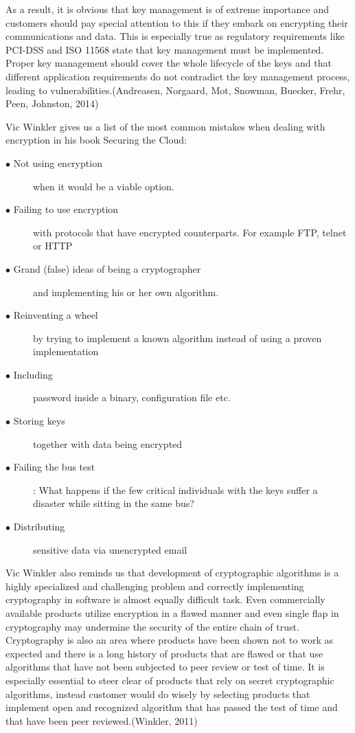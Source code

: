\documentclass{article}
\begin{document}
\par
As a result, it is obvious that key management is of extreme importance and customers should pay special attention to this if they embark on encrypting their communications and data. This is especially true as regulatory requirements like PCI-DSS and ISO 11568 state that key management must be implemented. Proper key management should cover the whole lifecycle of the keys and that different application requirements do not contradict the key management process, leading to vulnerabilities.(Andreasen, Norgaard, Mot, Snowman, Buecker, Frehr, Peen, Johnston, 2014)
\par
Vic Winkler gives us a list of the most common mistakes when dealing with encryption in his book Securing the Cloud:
\begin{description}
	\item[$\bullet$ Not using encryption] when it would be a viable option.
	\item[$\bullet$ Failing to use encryption] with protocols that have encrypted counterparts. For example FTP, telnet or HTTP 
	\item[$\bullet$ Grand (false) ideas of being a cryptographer] and implementing his or her own algorithm. 
	\item[$\bullet$ Reinventing a wheel] by trying to implement a known algorithm instead of using a proven implementation
	\item[$\bullet$ Including] password inside a binary, configuration file etc.
	\item[$\bullet$ Storing keys] together with data being encrypted
	\item[$\bullet$ Failing the bus test]: What happens if the few critical individuals with the keys suffer a disaster while sitting in the same bus? 
	\item[$\bullet$ Distributing] sensitive data via unencrypted email
\end{description} 
Vic Winkler also reminds us that development of cryptographic algorithms is a highly specialized and challenging problem and correctly implementing cryptography in software is almost equally difficult task. Even commercially available products utilize encryption in a flawed manner and even single flap in cryptography may undermine the security of the entire chain of trust. Cryptography is also an area where products have been shown not to work as expected and there is a long history of products that are flawed or that use algorithms that have not been subjected to peer review or test of time. It is especially essential to steer clear of products that rely on secret cryptographic algorithms, instead customer would do wisely by selecting products that implement open and recognized algorithm that has passed the test of time and that have been peer reviewed.(Winkler, 2011)
\end{document}
